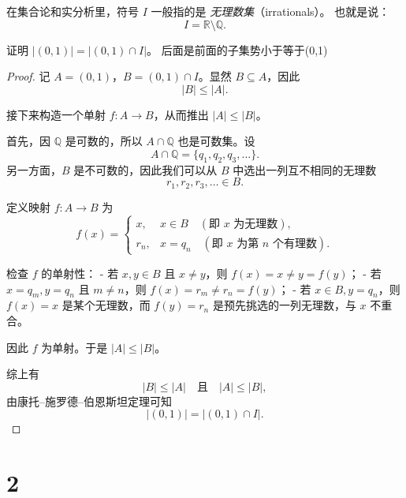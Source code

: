 在集合论和实分析里，符号 $I$ 一般指的是 \emph{无理数集}（irrationals）。  
也就是说：
\[
I = \mathbb{R} \setminus \mathbb{Q}.
\]

\begin{homework}[1.19]
证明 $|(0,1)| = |(0,1)\cap I|$。
后面是前面的子集势小于等于(0,1)
\end{homework}

\begin{proof}
记 $A=(0,1)$，$B=(0,1)\cap I$。显然 $B\subseteq A$，因此
\[
|B| \le |A|.
\]

接下来构造一个单射 $f:A\to B$，从而推出 $|A|\le |B|$。

首先，因 $\mathbb{Q}$ 是可数的，所以 $A\cap \mathbb{Q}$ 也是可数集。设
\[
A\cap \mathbb{Q} = \{q_1,q_2,q_3,\dots\}.
\]
另一方面，$B$ 是不可数的，因此我们可以从 $B$ 中选出一列互不相同的无理数
\[
r_1,r_2,r_3,\dots \in B.
\]

定义映射 $f:A\to B$ 为
\[
f(x) =
\begin{cases}
x, & x\in B \quad (\text{即 $x$ 为无理数}), \\[6pt]
r_n, & x=q_n \quad (\text{即 $x$ 为第 $n$ 个有理数}).
\end{cases}
\]

检查 $f$ 的单射性：  
- 若 $x,y\in B$ 且 $x\neq y$，则 $f(x)=x\neq y=f(y)$；  
- 若 $x=q_m,y=q_n$ 且 $m\neq n$，则 $f(x)=r_m\neq r_n=f(y)$；  
- 若 $x\in B, y=q_n$，则 $f(x)=x$ 是某个无理数，而 $f(y)=r_n$ 是预先挑选的一列无理数，与 $x$ 不重合。  

因此 $f$ 为单射。于是 $|A|\le |B|$。

综上有
\[
|B|\le |A|\quad\text{且}\quad |A|\le |B|,
\]
由康托–施罗德–伯恩斯坦定理可知
\[
|(0,1)| = |(0,1)\cap I|.
\]
\end{proof}

\chapter{2}
